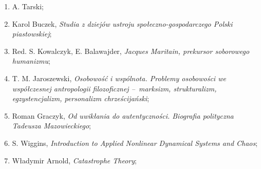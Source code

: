 \documentclass[a4paper,11pt]{article}
\begin{document}
\begin{enumerate}
\item A. Tarski;

\item Karol Buczek, \emph{Studia z dziejów ustroju
    społeczno-gospodarczego Polski piastowskiej};

\item Red. S. Kowalczyk, E. Balawajder, \emph{Jacques Maritain,
    prekursor soborowego humanizmu};

\item T. M. Jaroszewski, \emph{Osobowość i wspólnota. Problemy
    osobowości we współczesnej antropologii filozoficznej --~marksizm,
    strukturalizm, egzystencjalizm, personalizm chrześcijański};

\item Roman Graczyk, \emph{Od uwikłania do autentyczności. Biografia
    polityczna Tadeusza Mazowieckiego};

\item S. Wiggins, \emph{Introduction to Applied Nonlinear Dynamical
    Systems and Chaos};

\item Władymir Arnold, \emph{Catastrophe Theory};

















\end{enumerate}
\end{document}
